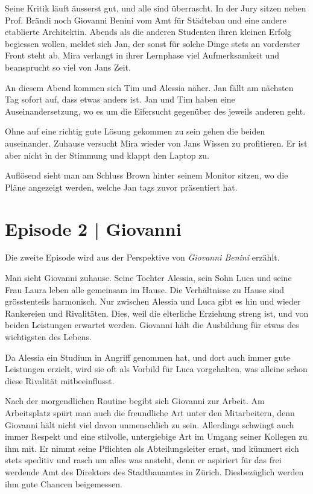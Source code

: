 \documentclass[11pt,a4paper,ngerman]{scrreprt}
\begin{document}
Seine Kritik läuft äusserst gut, und alle sind überrascht. In der Jury sitzen
neben Prof. Brändi noch Giovanni Benini vom Amt für Städtebau und eine andere
etablierte Architektin. Abends als die anderen Studenten ihren kleinen Erfolg
begiessen wollen, meldet sich Jan, der sonst für solche Dinge stets an
vorderster Front steht ab. Mira verlangt in ihrer Lernphase viel
Aufmerksamkeit und beansprucht so viel von Jans Zeit.

An diesem Abend kommen sich Tim und Alessia näher. Jan fällt am nächsten Tag
sofort auf, dass etwas anders ist. Jan und Tim haben eine Auseinandersetzung,
wo es um die Eifersucht gegenüber des jeweils anderen geht.

Ohne auf eine richtig gute Lösung gekommen zu sein gehen die beiden
auseinander. Zuhause versucht Mira wieder von Jans Wissen zu profitieren. Er
ist aber nicht in der Stimmung und klappt den Laptop zu.

Auflösend sieht man am Schluss Brown hinter seinem Monitor sitzen, wo die
Pläne angezeigt werden, welche Jan tags zuvor präsentiert hat.

\section*{Episode 2 | Giovanni}

Die zweite Episode wird aus der Perspektive von \emph{Giovanni Benini} erzählt.

Man sieht Giovanni zuhause. Seine Tochter Alessia, sein Sohn Luca und seine
Frau Laura leben alle gemeinsam im Hause. Die Verhältnisse zu Hause sind
grösstenteils harmonisch. Nur zwischen Alessia und Luca gibt es hin und
wieder Rankereien und Rivalitäten. Dies, weil die elterliche Erziehung streng
ist, und von beiden Leistungen erwartet werden. Giovanni hält die Ausbildung
für etwas des wichtigsten des Lebens.

Da Alessia ein Studium in Angriff genommen hat, und dort auch immer gute
Leistungen erzielt, wird sie oft als Vorbild für Luca vorgehalten, was
alleine schon diese Rivalität mitbeeinflusst.

Nach der morgendlichen Routine begibt sich Giovanni zur Arbeit. Am
Arbeitsplatz spürt man auch die freundliche Art unter den Mitarbeitern, denn
Giovanni hält nicht viel davon unmenschlich zu sein. Allerdings schwingt auch
immer Respekt und eine stilvolle, untergiebige Art im Umgang seiner Kollegen
zu ihm mit. Er nimmt seine Pflichten als Abteilungsleiter ernst, und kümmert
sich stets speditiv und rasch um alles was ansteht, denn er aspiriert für das
frei werdende Amt des Direktors des Stadtbauamtes in Zürich. Diesbezüglich
werden ihm gute Chancen beigemessen.
\end{document}
